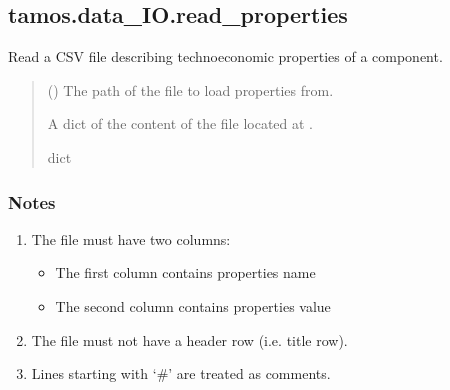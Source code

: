 \documentclass[letterpaper,10pt,english]{sphinxmanual}
\begin{document}
\sphinxstepscope


\subsection{tamos.data\_IO.read\_properties}
\label{\detokenize{generated/tamos.data_IO.read_properties:tamos-data-io-read-properties}}\label{\detokenize{generated/tamos.data_IO.read_properties::doc}}

\begin{fulllineitems}
\label{\detokenize{generated/tamos.data_IO.read_properties:tamos.data_IO.read_properties}}
\pysigstartsignatures
{}
\pysigstopsignatures
\sphinxAtStartPar
Read a CSV file describing techno\sphinxhyphen{}economic properties of a component.
\begin{quote}\begin{description}
\sphinxAtStartPar
{} () \textendash{} The path of the file to load properties from.

\sphinxAtStartPar
{} \textendash{} A dict of the content of the file located at .

\sphinxAtStartPar
dict

\end{description}\end{quote}
\subsubsection*{Notes}
\begin{enumerate}
%
\item {} 
\sphinxAtStartPar
The file must have two columns:
\begin{itemize}
\item {} 
\sphinxAtStartPar
The first column contains properties name

\item {} 
\sphinxAtStartPar
The second column contains properties value

\end{itemize}

\item {} 
\sphinxAtStartPar
The file must not have a header row (i.e. title row).

\item {} 
\sphinxAtStartPar
Lines starting with ‘\#’ are treated as comments.

\end{enumerate}

\end{fulllineitems}
\end{document}
